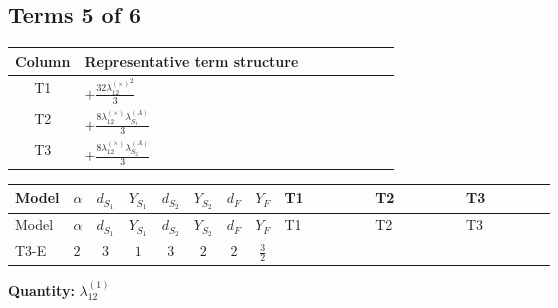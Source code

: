 \documentclass[8pt]{article}
\begin{document}
\begin{landscape}
\subsection*{Terms 5 of 6}
\begin{center}
\begin{tabular}{@{}c >{\raggedright\arraybackslash}p{0.82\linewidth}@{}}
\toprule
Column & Representative term structure \\
\midrule
T1 & \(\displaystyle +\frac{32 {\lambda_{12}^{(\times)}}^2}{3}\) \\
\midrule
T2 & \(\displaystyle +\frac{8 {\lambda_{12}^{(\times)}} {\lambda_{S_1}^{(A)}}}{3}\) \\
\midrule
T3 & \(\displaystyle +\frac{8 {\lambda_{12}^{(\times)}} {\lambda_{S_2}^{(A)}}}{3}\) \\
\midrule
\bottomrule
\end{tabular}
\end{center}
\smallskip
\tiny
\begin{longtable}{@{}llcccccc >{\raggedright\arraybackslash}p{0.21\linewidth} >{\raggedright\arraybackslash}p{0.21\linewidth} >{\raggedright\arraybackslash}p{0.21\linewidth}@{}}
\toprule
Model & $\alpha$ & $d_{S_1}$ & $Y_{S_1}$ & $d_{S_2}$ & $Y_{S_2}$ & $d_F$ & $Y_F$ & T1 & T2 & T3 \\
\midrule
\endfirsthead
\toprule
Model & $\alpha$ & $d_{S_1}$ & $Y_{S_1}$ & $d_{S_2}$ & $Y_{S_2}$ & $d_F$ & $Y_F$ & T1 & T2 & T3 \\
\midrule
\endhead
T3-E & $2$ & $3$ & $1$ & $3$ & $2$ & $2$ & $\frac{3}{2}$ & \scriptsize\adjustbox{max width=\linewidth}{$\begin{gathered} +\frac{32 {\lambda_{12}^{(\times)}}^2}{3}\end{gathered}$} & \scriptsize\adjustbox{max width=\linewidth}{$\begin{gathered} +\frac{8 {\lambda_{12}^{(\times)}} {\lambda_{S_1}^{(A)}}}{3}\end{gathered}$} & \scriptsize\adjustbox{max width=\linewidth}{$\begin{gathered} +\frac{8 {\lambda_{12}^{(\times)}} {\lambda_{S_2}^{(A)}}}{3}\end{gathered}$} \\
\midrule
\bottomrule
\end{longtable}
\clearpage
\noindent\textbf{Quantity: }$\lambda_{12}^{(1)}$\par\smallskip

\end{landscape}
\end{document}
